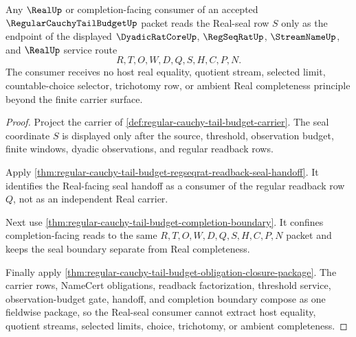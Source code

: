 \begin{theorem}
\label{thm:regular-cauchy-tail-budget-real-seal-consumer-scope}
Any $\RealUp$ or completion-facing consumer of an accepted $\RegularCauchyTailBudgetUp$ packet reads the Real-seal row $S$ only as the endpoint of the displayed $\DyadicRatCoreUp$, $\RegSeqRatUp$, $\StreamNameUp$, and $\RealUp$ service route
$$
R,T,O,W,D,Q,S,H,C,P,N.
$$
The consumer receives no host real equality, quotient stream, selected limit, countable-choice selector, trichotomy row, or ambient Real completeness principle beyond the finite carrier surface.
\end{theorem}
\begin{proof}
Project the carrier of \autoref{def:regular-cauchy-tail-budget-carrier}. The seal coordinate $S$ is displayed only after the source, threshold, observation budget, finite windows, dyadic observations, and regular readback rows.

Apply \autoref{thm:regular-cauchy-tail-budget-regseqrat-readback-seal-handoff}. It identifies the Real-facing seal handoff as a consumer of the regular readback row $Q$, not as an independent Real carrier.

Next use \autoref{thm:regular-cauchy-tail-budget-completion-boundary}. It confines completion-facing reads to the same $R,T,O,W,D,Q,S,H,C,P,N$ packet and keeps the seal boundary separate from Real completeness.

Finally apply \autoref{thm:regular-cauchy-tail-budget-obligation-closure-package}. The carrier rows, NameCert obligations, readback factorization, threshold service, observation-budget gate, handoff, and completion boundary compose as one fieldwise package, so the Real-seal consumer cannot extract host equality, quotient streams, selected limits, choice, trichotomy, or ambient completeness.
\end{proof}

